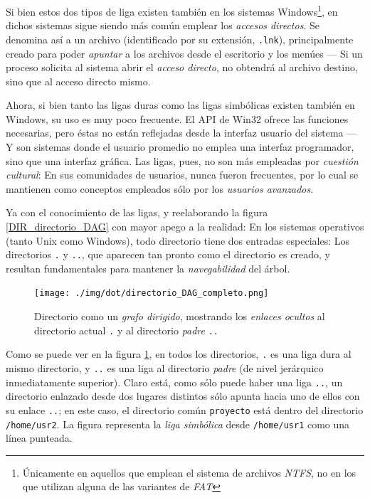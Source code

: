 \documentclass[11pt,fleqn]{book} %
\begin{document}
Si bien estos dos tipos de liga existen también en los sistemas
Windows\footnote{Únicamente en aquellos que emplean el sistema de archivos
\emph{NTFS}, no en los que utilizan alguna de las variantes
de \emph{FAT} }, en dichos sistemas sigue siendo más común emplear los
\emph{accesos directos}. Se denomina así a un archivo (identificado por su
extensión, \texttt{.lnk}), principalmente creado para poder \emph{apuntar} a los
archivos desde el escritorio y los menúes — Si un proceso solicita al
sistema abrir el \emph{acceso directo}, no obtendrá al archivo destino,
sino que al acceso directo mismo.

Ahora, si bien tanto las ligas duras como las ligas simbólicas existen
también en Windows, su uso es muy poco frecuente. El API de Win32
ofrece las funciones necesarias, pero éstas no están reflejadas desde
la interfaz usuario del sistema — Y son sistemas donde el usuario
promedio no emplea una interfaz programador, sino que una interfaz
gráfica. Las ligas, pues, no son más empleadas por
\emph{cuestión cultural}: En sus comunidades de usuarios, nunca fueron
frecuentes, por lo cual se mantienen como conceptos empleados sólo por
los \emph{usuarios avanzados}.

Ya con el conocimiento de las ligas, y reelaborando la figura
\ref{DIR_directorio_DAG} con mayor apego a la realidad: En los
sistemas operativos (tanto Unix como Windows), todo directorio tiene
dos entradas especiales: Los directorios \texttt{.} y \texttt{..}, que aparecen tan
pronto como el directorio es creado, y resultan fundamentales para
mantener la \emph{navegabilidad} del árbol.

\begin{figure}[htb]
\centering
\texttt{[image: ./img/dot/directorio\_DAG\_completo.png]}
\caption{\label{DIR_directorio_DAG_completo}Directorio como un \emph{grafo dirigido}, mostrando los \emph{enlaces ocultos} al directorio actual \texttt{.} y al directorio \emph{padre} \texttt{..}}
\end{figure}

Como se puede ver en la figura \ref{DIR_directorio_DAG_completo}, en
todos los directorios, \texttt{.} es una liga dura al mismo directorio, y
\texttt{..} es una liga al directorio \emph{padre} (de nivel jerárquico
inmediatamente superior). Claro está, como sólo puede
haber una liga \texttt{..}, un directorio enlazado desde dos lugares
distintos sólo apunta hacia uno de ellos con
su enlace \texttt{..}; en este caso, el directorio común \texttt{proyecto} está
dentro del directorio \texttt{/home/usr2}. La figura representa la \emph{liga simbólica} desde \texttt{/home/usr1} como una línea punteada.
\end{document}
